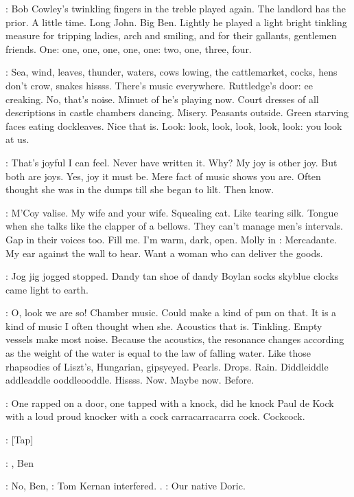 :
Bob Cowley's twinkling fingers in the treble played again. The
landlord has the prior. A little time. Long John. Big Ben. Lightly he
played a light bright tinkling measure for tripping ladies,
arch and
smiling, and for their gallants, gentlemen friends. One: one, one, one,
one, one: two, one, three, four.

\BloomInt:
Sea, wind, leaves, thunder, waters, cows lowing, the cattlemarket,
cocks, hens don't crow, snakes hissss. There's music everywhere.
Ruttledge's door: ee creaking. No, that's noise. Minuet of
he's playing now. Court dresses of all descriptions in castle chambers
dancing. Misery. Peasants outside. Green starving faces eating
dockleaves. Nice that is. Look: look, look, look, look, look: you
look at us.

\BloomInt:
That's joyful I can feel. Never have written it. Why? My joy is other
joy. But both are joys.
Yes, joy it must be. Mere fact of music shows you
are. Often thought she was in the dumps till she began to lilt. Then
know.

\BloomInt:
M'Coy valise. My wife and your wife. Squealing cat. Like tearing silk.
Tongue when she talks like the clapper of a bellows. They can't manage
men's intervals. Gap in their voices too. Fill me. I'm warm, dark, open.
Molly in :
Mercadante. My ear against the wall to hear. Want
a woman who can deliver the goods.

\BloomInt:
Jog jig jogged stopped. Dandy tan shoe of dandy Boylan socks
skyblue clocks came light to earth.

\BloomInt:
O, look we are so! Chamber music. Could make a kind of pun on
that.
It is a kind of music I often thought when she. Acoustics that is.
Tinkling. Empty vessels make most noise. Because the acoustics, the
resonance changes according as the weight of the water is equal to the law
of falling water. Like those rhapsodies of Liszt's, Hungarian, gipsyeyed.
Pearls. Drops. Rain. Diddleiddle addleaddle ooddleooddle. Hissss. Now.
Maybe now. Before.

\BloomInt:
One rapped on a door, one tapped with a knock, did he knock Paul
de Kock with a loud proud knocker with a cock carracarracarra cock.
Cockcock.

\stripling:
[Tap]

\cowley:
, Ben

:
No, Ben,
:
Tom Kernan interfered.
.
:
Our native Doric.

